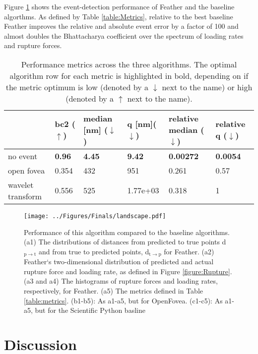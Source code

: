 \documentclass[%
  aip,12pt,tightenlines,
  amsthm,
 amsmath,amssymb
]{article}
\newcommand{\e}[0]{\\ \hline}
\newcommand{\tRef}[1]{Table \ref{table:#1}}
\newcommand{\fRef}[1]{Figure \ref{figure:#1}}
\newcommand{\fLabel}[1]{\label{figure:#1}}
\newcommand{\tLabel}[1]{\label{table:#1}}
\newcommand{\sLabel}[1]{\label{section:#1}}
\newcommand{\pEndF}[0]{ \\ }
\newcommand{\pStartF}[0]{ }
\newcommand{\name}[0]{Feather}
\newcommand{\figwidth}[0]{\linewidth}
\begin{document}
\fRef{Performance} shows the event-detection performance of \name{} and the baseline algorthms. As defined by \tRef{Metrics}, relative to the best baseline \name{} improves the relative and absolute event error by a factor of 100 and almost doubles the Bhattacharya coefficient over the spectrum of loading rates and rupture forces. 

\begin{table}
\begin{tabularx}{\textwidth}{ l || l | l | l | l | l }
\hline \hline
  & bc2 ($\uparrow$) & median [nm] ($\downarrow$) & q [nm]($\downarrow$) & relative median ($\downarrow$) & relative q ($\downarrow$)\e\hline 
no event & \textbf{0.96} & \textbf{4.45} & \textbf{9.42} & \textbf{0.00272} & \textbf{0.0054}\e
open fovea & 0.354 & 432 & 951 & 0.261 & 0.57\e
wavelet transform & 0.556 & 525 & 1.77e+03 & 0.318 & 1\e
\end{tabularx}
\caption[Algorithm performance]{\tLabel{AppliedMetrics} Performance metrics across the three algorithms. The optimal algorithm row for each metric is highlighted in bold, depending on if the metric optimum is low (denoted by a $\downarrow$ next to the name) or high (denoted by a $\uparrow$ next to the name).} 
\end{table}




\begin{figure}
\centering
\texttt{[image: ../Figures/Finals/landscape.pdf]}%
\caption[Algorithm Performance]{\noindent\fLabel{Performance}\pStartF Performance of this algorithm compared to the baseline algorithms. (a1) The distributions of distances from predicted to true points d$_{\mathrm{p}\rightarrow\mathrm{t}}$ and from true to predicted points, d$_{\mathrm{t}\rightarrow\mathrm{p}}$ for \name{}. (a2) \name{}`s two-dimensional distribution of predicted and actual rupture force and loading rate, as defined in \fRef{Rupture}. (a3 and a4) The histograms of rupture forces and loading rates, respectively, for \name{}.  (a5) The metrics defined in \tRef{metrics}. (b1-b5): As a1-a5, but for OpenFovea. (c1-c5): As a1-a5, but for the Scientific Python basline \pEndF }
\end{figure}



\section{\sLabel{Discussion}Discussion}
\end{document}
